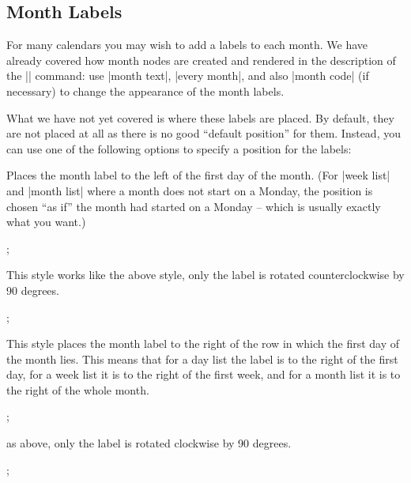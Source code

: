 \subsection{Month Labels}

For many calendars you may wish to add a labels to each month. We have
already covered how month nodes are created and rendered in the
description of the |\calendar| command: use |month text|,
|every month|, and also |month code| (if necessary) to change the
appearance of the month labels.

What we have not yet covered is where these labels are placed. By
default, they are not placed at all as there is no good ``default
position'' for them. Instead, you can use one of the following options
to specify a position for the labels:
\begin{itemize}
  Places the month label to the left of the first day of the
  month. (For |week list| and |month list| where a month does not
  start on a Monday, the position is chosen ``as if'' the month had
  started on a Monday --  which is usually exactly what you want.)
\begin{codeexample}[]
\tikz
  \calendar [dates=2000-01-28 to 2000-02-03,
             day list downward,month yshift=1em,
             month label left];
\end{codeexample}
  This style works like the above style, only the label is rotated
  counterclockwise by 90 degrees.
\begin{codeexample}[]
\tikz
  \calendar [dates=2000-01-28 to 2000-02-03,
             day list downward,month yshift=1em,
             month label left vertical];
\end{codeexample}
  This style places the month label to the right of the row in which
  the first day of the month lies. This means that for a day list the
  label is to the right of the first day, for a week list it is to the
  right of the first week, and for a month list it is to the right of
  the whole month.
\begin{codeexample}[]
\tikz
  \calendar [dates=2000-01-28 to 2000-02-03,
             day list downward,month yshift=1em,
             month label right];
\end{codeexample}
  as above, only the label is rotated clockwise by 90 degrees.
\begin{codeexample}[]
\tikz
  \calendar [dates=2000-01-28 to 2000-02-03,
             day list downward,month yshift=1em,
             month label right vertical];
\end{codeexample}


\end{itemize}
